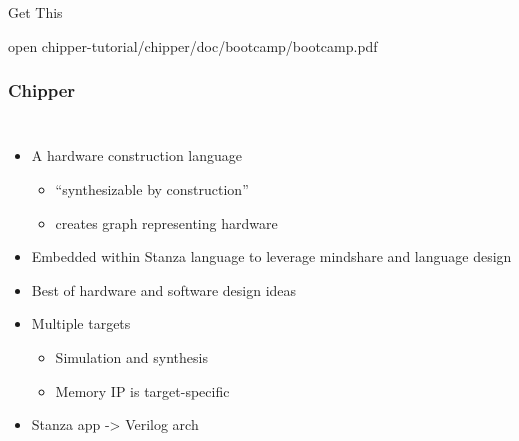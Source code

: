 \documentclass[xcolor=pdflatex,dvipsnames,table]{beamer}
\begin{document}
\begin{frame}[fragile]{Get This}

\begin{bash}
open chipper-tutorial/chipper/doc/bootcamp/bootcamp.pdf
\end{bash}

\end{frame}

\begin{frame}[fragile]
\frametitle{Chipper}

\begin{columns}[c]


\begin{itemize}
\item A hardware construction language 
\begin{itemize}
\item ``synthesizable by construction''
\item creates graph representing hardware
\end{itemize}
\item Embedded within Stanza language to leverage mindshare and language design
\item Best of hardware and software design ideas
\item Multiple targets
\begin{itemize}
\item Simulation and synthesis
\item Memory IP is target-specific \\[0.5cm]
\end{itemize}
\item {\color{red}{\bf Not} Stanza app -> Verilog arch}
\end{itemize}



\end{columns}
\end{frame}
\end{document}
